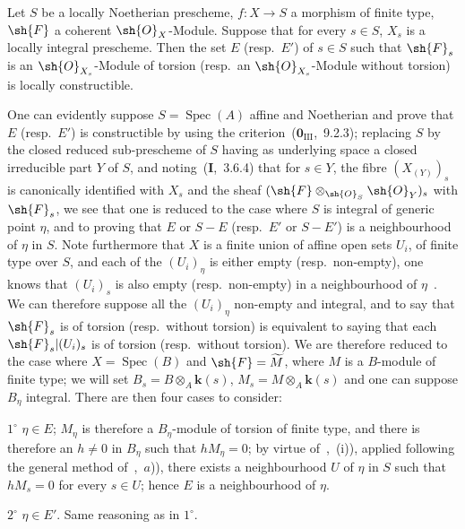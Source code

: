 \begin{proposition}[9.4.8]
\label{IV.9.4.8}
Let $S$ be a locally Noetherian prescheme, $f:X\to S$ a morphism of finite type, $\sh{F}$ a coherent $\sh{O}_X$-Module.
Suppose that for every $s\in S$, $X_s$ is a locally integral prescheme.
Then the set $E$ \textnormal{(}resp.\ $E'$\textnormal{)} of $s\in S$ such that $\sh{F}_s$ is an $\sh{O}_{X_s}$-Module of torsion \textnormal{(}resp.\ an $\sh{O}_{X_s}$-Module without torsion\textnormal{)} is locally constructible.
\end{proposition}

One can evidently suppose $S=\operatorname{Spec}(A)$ affine and Noetherian and prove that $E$ (resp.\ $E'$) is constructible by using the criterion~($\mathbf{0}_{\mathrm{III}}$,~9.2.3); replacing $S$ by the closed reduced sub-prescheme of $S$ having as underlying space a closed irreducible part $Y$ of $S$, and noting~(\textbf{I},~3.6.4) that for $s\in Y$, the fibre $(X_{(Y)})_s$ is canonically identified with $X_s$ and the sheaf $(\sh{F}\otimes_{\sh{O}_S}\sh{O}_Y)_s$ with $\sh{F}_s$, we see that one is reduced to the case where $S$ is integral of generic point $\eta$, and to proving that $E$ or $S-E$ (resp.\ $E'$ or $S-E'$) is a neighbourhood of $\eta$ in $S$.
Note furthermore that $X$ is a finite union of affine open sets $U_i$, of finite type over $S$, and each of the $(U_i)_\eta$ is either empty (resp.\ non-empty), one knows that $(U_i)_s$ is also empty (resp.\ non-empty) in a neighbourhood of $\eta$~.
We can therefore suppose all the $(U_i)_\eta$ non-empty and integral, and to say that $\sh{F}_s$ is of torsion (resp.\ without torsion) is equivalent to saying that each $\sh{F}_s|(U_i)_s$ is of torsion (resp.\ without torsion).
We are therefore reduced to the case where $X=\operatorname{Spec}(B)$ and $\sh{F}=\widetilde{M}$, where $M$ is a $B$-module of finite type; we will set $B_s=B\otimes_A\mathbf{k}(s)$, $M_s=M\otimes_A\mathbf{k}(s)$ and one can suppose $B_\eta$ integral.
There are then four cases to consider:

$1^\circ$ $\eta\in E$; $M_\eta$ is therefore a $B_\eta$-module of torsion of finite type, and there is therefore an $h\neq 0$ in $B_\eta$ such that $hM_\eta=0$; by virtue of~,~(i)), applied following the general method of~,~$a$)), there exists a neighbourhood $U$ of $\eta$ in $S$ such that $hM_s=0$ for every $s\in U$; hence $E$ is a neighbourhood of $\eta$.


$2^\circ$ $\eta\in E'$.
Same reasoning as in $1^\circ$.

